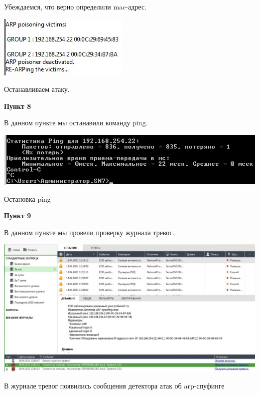 \documentclass[a4paper,14pt]{extarticle}
\begin{document}
\begin{center}
        Убеждаемся, что верно определили mac-адрес.

        \includegraphics[scale=0.9]{pics/7_5.jpg}

        Останавливаем атаку.
    \end{center}

    \textbf{Пункт 8}
    \vspace{-3ex}
    \begin{center}
        \singlespacing
        В данном пункте мы останавили команду ping.

        \includegraphics[scale=0.5]{pics/8.jpg}

        Остановка ping
    \end{center}

    \vspace{-2ex}
    \textbf{Пункт 9}
    \vspace{-3ex}
    \begin{center}
        \singlespacing
        В данном пункте мы провели проверку журнала тревог. 

        \includegraphics[scale=0.4]{pics/9.jpg}

        В журнале тревог появились сообщения детектора атак об arp-спуфинге
    \end{center}
\end{document}

